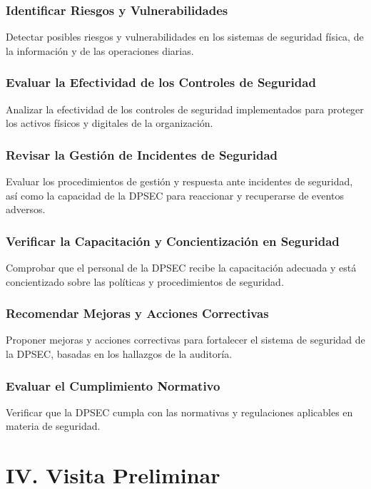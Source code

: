 \documentclass[12pt,a4paper]{article}
\begin{document}
\subsubsection*{Identificar Riesgos y Vulnerabilidades} Detectar posibles riesgos y vulnerabilidades en los sistemas de seguridad física, de la información y de las operaciones diarias.

\subsubsection*{Evaluar la Efectividad de los Controles de Seguridad} Analizar la efectividad de los controles de seguridad implementados para proteger los activos físicos y digitales de la organización.

\subsubsection*{Revisar la Gestión de Incidentes de Seguridad} Evaluar los procedimientos de gestión y respuesta ante incidentes de seguridad, así como la capacidad de la DPSEC para reaccionar y recuperarse de eventos adversos.

\subsubsection*{Verificar la Capacitación y Concientización en Seguridad} Comprobar que el personal de la DPSEC recibe la capacitación adecuada y está concientizado sobre las políticas y procedimientos de seguridad.

\subsubsection*{Recomendar Mejoras y Acciones Correctivas} Proponer mejoras y acciones correctivas para fortalecer el sistema de seguridad de la DPSEC, basadas en los hallazgos de la auditoría.

\subsubsection*{Evaluar el Cumplimiento Normativo} Verificar que la DPSEC cumpla con las normativas y regulaciones aplicables en materia de seguridad.

\newpage
\section{IV. Visita Preliminar}
\end{document}
